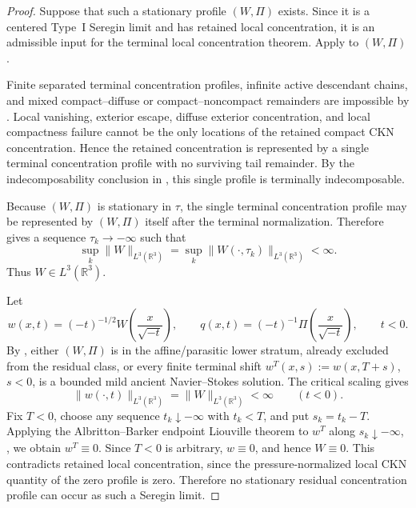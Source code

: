 \documentclass[11pt]{amsart}
\numberwithin{equation}{section}
\theoremstyle{plain}
\theoremstyle{definition}
\theoremstyle{remark}
\begin{document}
\begin{proof}
Suppose that such a stationary profile \((W,\Pi)\) exists.  Since it is a
centered Type~I Seregin limit and has retained local concentration, it is an admissible input
for the terminal local concentration theorem.  Apply  to
\((W,\Pi)\).

Finite separated terminal concentration profiles, infinite active descendant
chains, and mixed compact--diffuse or compact--noncompact remainders are
impossible by .  Local vanishing, exterior
escape, diffuse exterior concentration, and local compactness failure cannot be
the only locations of the retained compact CKN concentration.  Hence the
retained concentration is represented by a single terminal concentration
profile with no surviving tail remainder.  By the indecomposability conclusion
in , this single profile is terminally
indecomposable.

Because \((W,\Pi)\) is stationary in \(\tau\), the single terminal
concentration profile may be represented by \((W,\Pi)\) itself after the
terminal normalization.  Therefore
 gives a sequence \(\tau_k\to-\infty\) such that
\begin{equation}\label{eq:R3S-W-L3-sequence}
   \sup_k\|W\|_{L^3(\mathbb R^3)}
   =
   \sup_k\|W(\cdot,\tau_k)\|_{L^3(\mathbb R^3)}
   <\infty .
\end{equation}
Thus \(W\in L^3(\mathbb R^3)\).

Let
\begin{equation}\label{eq:R3S-physical-pullback}
   w(x,t)=(-t)^{-1/2}W\!\left(\frac{x}{\sqrt{-t}}\right),
   \qquad
   q(x,t)=(-t)^{-1}\Pi\!\left(\frac{x}{\sqrt{-t}}\right),
   \qquad t<0 .
\end{equation}
By , either \((W,\Pi)\) is in the
affine/parasitic lower stratum, already excluded from the residual class, or
every finite terminal shift \(w^T(x,s):=w(x,T+s)\), \(s<0\), is a bounded mild
ancient Navier--Stokes solution.  The critical scaling gives
\begin{equation}\label{eq:R3S-critical-L3-scaling}
   \|w(\cdot,t)\|_{L^3(\mathbb R^3)}=\|W\|_{L^3(\mathbb R^3)}<\infty
   \qquad (t<0).
\end{equation}
Fix \(T<0\), choose any sequence \(t_k\downarrow-\infty\) with \(t_k<T\), and
put \(s_k=t_k-T\).  Applying the Albritton--Barker endpoint Liouville theorem
to \(w^T\) along \(s_k\downarrow-\infty\), , we obtain
\(w^T\equiv0\).  Since \(T<0\) is arbitrary, \(w\equiv0\), and hence
\(W\equiv0\).
This contradicts retained local concentration, since the pressure-normalized
local CKN quantity of the zero profile is zero.  Therefore no stationary
residual concentration profile can occur as such a Seregin limit.
\end{proof}
\end{document}
